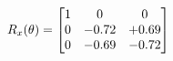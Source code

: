 \documentclass[preview]{standalone}
\begin{document}
\begin{align*}
\special{dvisvgm:raw <g id='unique000'>}R_{x}(\theta) = \begin{bmatrix}1 & 0 & 0 \\0 & -0.72 & +0.69 \\0 & -0.69 & -0.72\end{bmatrix}\special{dvisvgm:raw </g>}
\end{align*}
\end{document}
